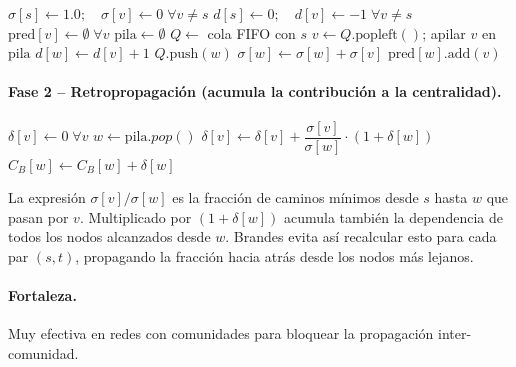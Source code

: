 \documentclass[spanish,notitlepage,letterpaper, 12pt]{article}
\begin{document}
\begin{algorithm}[H]
\caption{Fase 1 del algoritmo de Brandes desde la fuente $s$ (BFS no ponderado)}
\begin{algorithmic}[1]
\State $\sigma[s] \gets 1.0; \quad \sigma[v] \gets 0 \;\forall v \neq s$
\State $d[s] \gets 0; \quad d[v] \gets -1 \;\forall v \neq s$
\State $\text{pred}[v] \gets \emptyset \;\forall v$
\State $\text{pila} \gets \emptyset$
\State $Q \gets$ cola FIFO con $s$
    \State $v \gets Q.\text{popleft}()$; apilar $v$ en $\text{pila}$
            \State $d[w] \gets d[v] + 1$
            \State $Q.\text{push}(w)$
        \EndIf
            \State $\sigma[w] \gets \sigma[w] + \sigma[v]$
            \State $\text{pred}[w].\text{add}(v)$
        \EndIf
    \EndFor
\EndWhile
\end{algorithmic}
\end{algorithm}

\paragraph{Fase 2 -- Retropropagaci\'on (acumula la contribuci\'on a la centralidad).}

\begin{algorithm}[H]
\caption{Fase 2 del algoritmo de Brandes}
\begin{algorithmic}[1]
\State $\delta[v] \gets 0 \;\forall v$
    \State $w \gets \text{pila}.pop()$
        \State $\delta[v] \gets \delta[v] + \dfrac{\sigma[v]}{\sigma[w]} \cdot (1 + \delta[w])$
    \EndFor
        \State $C_B[w] \gets C_B[w] + \delta[w]$
    \EndIf
\EndWhile
\end{algorithmic}
\end{algorithm}

La expresi\'on $\sigma[v]/\sigma[w]$ es la fracci\'on de caminos m\'inimos desde $s$ hasta $w$ que pasan por $v$. Multiplicado por $(1 + \delta[w])$ acumula tambi\'en la dependencia de todos los nodos alcanzados desde $w$. Brandes evita as\'i recalcular esto para cada par $(s,t)$, propagando la fracci\'on hacia atr\'as desde los nodos m\'as lejanos.

\paragraph{Fortaleza.} Muy efectiva en redes con comunidades para bloquear la propagaci\'on inter-comunidad.
\end{document}

